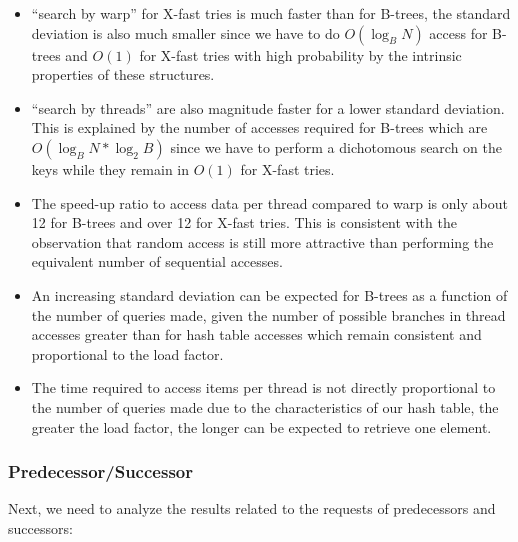 \begin{itemize}
    \item ``search by warp'' for X-fast tries is much faster than for B-trees, the standard deviation is also much smaller since we have to do $O(\log_{B}N)$ access for B-trees and $O(1)$ for X-fast tries with high probability by the intrinsic properties of these structures.
    \item ``search by threads'' are also magnitude faster for a lower standard deviation. This is explained by the number of accesses required for B-trees which are $O(\log_{B}N * \log_{2}B)$ since we have to perform a dichotomous search on the keys while they remain in $O(1)$ for X-fast tries.
    \item The speed-up ratio to access data per thread compared to warp is only about 12 for B-trees and over 12 for X-fast tries. This is consistent with the observation that random access is still more attractive than performing the equivalent number of sequential accesses.
    \item An increasing standard deviation can be expected for B-trees as a function of the number of queries made, given the number of possible branches in thread accesses greater than for hash table accesses which remain consistent and proportional to the load factor.
    \item The time required to access items per thread is not directly proportional to the number of queries made due to the characteristics of our hash table, the greater the load factor, the longer can be expected to retrieve one element.\\
\end{itemize}

\subsubsection{Predecessor/Successor}

Next, we need to analyze the results related to the requests of predecessors and successors:

